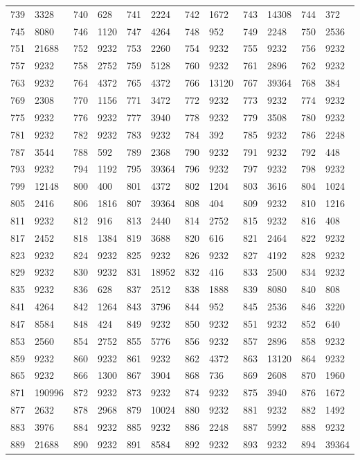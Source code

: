 \begin{longtable}{llllllllllll}
739 & 3328&740 &628&741& 2224&742 &1672&743 &14308&744& 372\\
745 & 8080&746 &1120&747& 4264&748 &952&749 &2248&750& 2536\\
751 & 21688&752 &9232&753& 2260&754 &9232&755 &9232&756& 9232\\
757 & 9232&758 &2752&759& 5128&760 &9232&761 &2896&762& 9232\\
763 & 9232&764 &4372&765& 4372&766 &13120&767 &39364&768& 384\\
769 & 2308&770 &1156&771& 3472&772 &9232&773 &9232&774& 9232\\
775 & 9232&776 &9232&777& 3940&778 &9232&779 &3508&780& 9232\\
781 & 9232&782 &9232&783& 9232&784 &392&785 &9232&786& 2248\\
787 & 3544&788 &592&789& 2368&790 &9232&791 &9232&792& 448\\
793 & 9232&794 &1192&795& 39364&796 &9232&797 &9232&798& 9232\\
799 & 12148&800 &400&801& 4372&802 &1204&803 &3616&804& 1024\\
805 & 2416&806 &1816&807& 39364&808 &404&809 &9232&810& 1216\\
811 & 9232&812 &916&813& 2440&814 &2752&815 &9232&816& 408\\
817 & 2452&818 &1384&819& 3688&820 &616&821 &2464&822& 9232\\
823 & 9232&824 &9232&825& 9232&826 &9232&827 &4192&828& 9232\\
829 & 9232&830 &9232&831& 18952&832 &416&833 &2500&834& 9232\\
835 & 9232&836 &628&837& 2512&838 &1888&839 &8080&840& 808\\
841 & 4264&842 &1264&843& 3796&844 &952&845 &2536&846& 3220\\
847 & 8584&848 &424&849& 9232&850 &9232&851 &9232&852& 640\\
853 & 2560&854 &2752&855& 5776&856 &9232&857 &2896&858& 9232\\
859 & 9232&860 &9232&861& 9232&862 &4372&863 &13120&864& 9232\\
865 & 9232&866 &1300&867& 3904&868 &736&869 &2608&870& 1960\\
871 & 190996&872 &9232&873& 9232&874 &9232&875 &3940&876& 1672\\
877 & 2632&878 &2968&879& 10024&880 &9232&881 &9232&882& 1492\\
883 & 3976&884 &9232&885& 9232&886 &2248&887 &5992&888& 9232\\
889 & 21688&890 &9232&891& 8584&892 &9232&893 &9232&894& 39364\\

\end{longtable}

